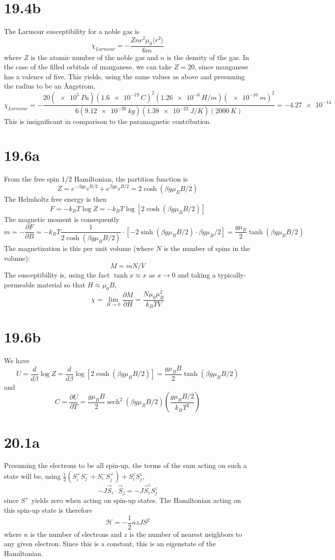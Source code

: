 \documentclass{article}
\DeclareMathOperator{\sech}{sech}
\begin{document}
\section*{19.4b}
The Larmour susceptibility for a noble gas is
\[
  \chi_{Larmour}=-\frac{Zne^{2}\mu_{0}\langle r^{2}\rangle}{6m}
\]
where $Z$ is the atomic number of the noble gas and $n$ is the density of the gas.
In the case of the filled orbitals of manganese, we can take $Z=20$, since manganese has a valence of five.
This yields, using the same values as above and presuming the radius to be an \r{A}ngstrom,
\[
  \chi_{Larmour}=-\frac{20(\SI{e5}{Pa})(\SI{1.6e-19}{C})^{2}(\SI{1.26e-6}{H/m})(\SI{e-10}{m})^{2}}
  {6(\SI{9.12e-26}{kg})(\SI{1.38e-23}{J/K})(\SI{2000}{K})}
  =\SI{-4.27e-14}{}
\]
This is insignificant in comparison to the paramagnetic contribution.

\section*{19.6a}
From the free spin 1/2 Hamiltonian, the partition function is
\[
  Z=e^{-\beta g\mu_{B}B/2}+e^{\beta g\mu_{B}B/2}=2\cosh\left( \beta g\mu_{B}B/2 \right)
\]
The Helmholtz free energy is then
\[
  F=-k_{B}T\log Z=-k_{B}T\log\left[ 2\cosh\left( \beta g\mu_{B}B/2 \right) \right]
\]
The magnetic moment is consequently
\[
  m=-\frac{\partial F}{\partial B}=-k_{B}T\frac{1}{2\cosh\left( \beta g\mu_{B}B/2 \right)}\cdot
  \left[-2\sinh\left( \beta g\mu_{B}B/2 \right)\cdot \beta g\mu_{B}/2\right]
  =\frac{g\mu_{B}}{2}\tanh(\beta g\mu_{B}B/2)
\]
The magnetization is this per unit volume (where $N$ is the number of spins in the volume):
\[
  M=mN/V
\]
The susceptibility is, using the fact $\tanh x\approx x$ as $x\to 0$ and taking a typically-permeable material so that $H\approx\mu_{0}B$,
\[
  \chi=\lim_{H\to 0}\frac{\partial M}{\partial H}=\frac{N\mu_{0}\mu_{B}^{2}}{k_{B}TV}
\]

\section*{19.6b}
We have
\[
  U=\frac{d}{d\beta}\log Z=\frac{d}{d\beta}\log\left[ 2\cosh\left( \beta g\mu_{B}B/2 \right) \right]
  =\frac{g\mu_{B}B}{2}\tanh(\beta g\mu_{B}B/2)
\]
and
\[
  C=\frac{\partial U}{\partial T}=\frac{g\mu_{B}B}{2}\sech^{2}(\beta g\mu_{B}B/2)\left( \frac{g\mu_{B}B/2}{k_{B}T^{2}} \right)
\]

\section*{20.1a}
Presuming the electrons to be all spin-up, the terms of the sum acting on such a state will be, using
$\frac{1}{2}(S_{i}^{+}S_{j}^{-}+S_{i}^{-}S_{j}^{+})+S_{i}^{z}S_{j}^{z}$,
\[
  -J\vec{S}_{i}\cdot\vec{S}_{j}=-J\vec{S}_{i}^{z}S_{j}^{z}
\]
since $S^{+}$ yields zero when acting on spin-up states.
The Hamiltonian acting on this spin-up state is therefore
\[
  \mathcal{H}=-\frac{1}{2}nzJS^{2}
\]
where $n$ is the number of electrons and $z$ is the number of nearest neighbors to any given electron.
Since this is a constant, this is an eigenstate of the Hamiltonian.
\end{document}
